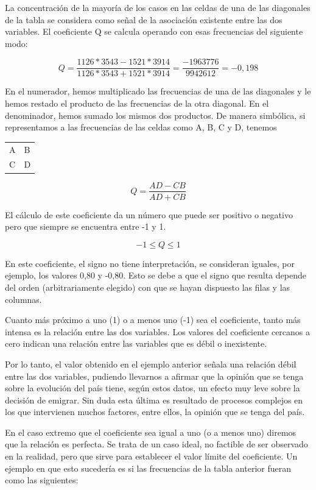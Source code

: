\documentclass[]{book}
\begin{document}
La concentración de la mayoría de los casos en las celdas de una de las diagonales de la tabla se considera como señal de la asociación existente entre las dos variables. El coeficiente Q se calcula operando con esas frecuencias del siguiente modo:

\[Q = \frac{1126*3543 - 1521*3914}{1126*3543 + 1521*3914} = \frac{-1963776}{9942612} = -0,198\]

En el numerador, hemos multiplicado las frecuencias de una de las
diagonales y le hemos restado el producto de las frecuencias
de la otra diagonal. En el denominador, hemos sumado los mismos
dos productos. De manera simbólica, si representamos a las frecuencias
de las celdas como A, B, C y D, tenemos

\begin{longtable}[]{@{}ll@{}}
\toprule
\endhead
A & B\tabularnewline
C & D\tabularnewline
\bottomrule
\end{longtable}

\[Q = \frac{AD - CB}{AD + CB}\]

El cálculo de este coeficiente da un número que puede ser positivo o
negativo pero que siempre se encuentra entre -1 y 1.

\[- 1 \leq Q \leq 1\]

En este coeficiente, el signo no tiene interpretación, se consideran
iguales, por ejemplo, los valores 0,80 y -0,80. Esto se debe a que el
signo que resulta depende del orden (arbitrariamente elegido) con que se hayan dispuesto las filas y las columnas.

Cuanto más próximo a uno (1) o a menos uno (-1) sea el coeficiente,
tanto más intensa es la relación entre las dos variables. Los valores
del coeficiente cercanos a cero indican una relación entre las variables que es débil o inexistente.

Por lo tanto, el valor obtenido en el ejemplo anterior señala una
relación débil entre las dos variables, pudiendo llevarnos a afirmar
que la opinión que se tenga sobre la evolución del país tiene, según estos datos, un efecto muy leve sobre la decisión de emigrar. Sin duda esta última es resultado de procesos complejos en los que intervienen muchos factores, entre ellos, la opinión que se tenga del país.

En el caso extremo que el coeficiente sea igual a uno (o a menos uno)
diremos que la relación es perfecta. Se trata de un caso ideal, no factible de ser observado en la realidad, pero que sirve para establecer el valor límite del coeficiente. Un ejemplo en que esto sucedería es si las frecuencias de la tabla anterior fueran como las siguientes:
\end{document}

